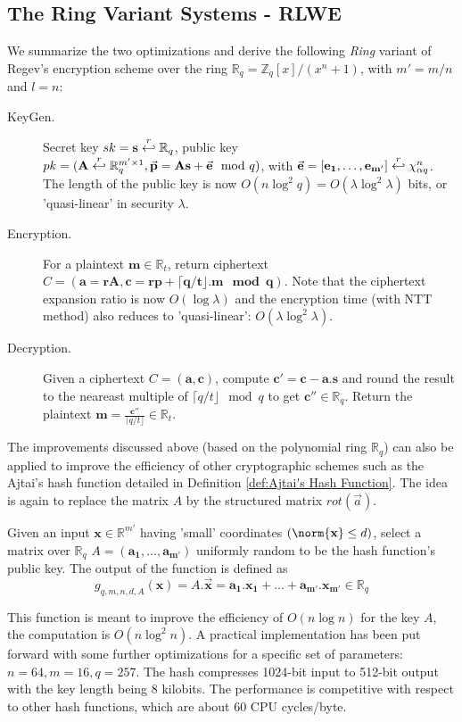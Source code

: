 \subsection{The Ring Variant Systems - RLWE}
\label{sec:RLWEPre}
We summarize the two optimizations and derive the following \emph{Ring} variant
of Regev's encryption scheme over the ring
$\mathbb{R}_q = \mathbb{Z}_q[x]/(x^n + 1)$, with $m' = m/n$ and $l = n$:
\begin{description}
\item[KeyGen.] Secret key $sk = \mathbf{s} \stackrel{r}{\hookleftarrow} \mathbb{R}_q$, public
  key
  $pk = (\mathbf{A} \stackrel{r}{\hookleftarrow} \mathbb{R}_q^{m' \times 1}, \vec{\mathbf{p}} =
  \mathbf{As} + \vec{\mathbf{e}} \mod q )$, with
  $\vec{\mathbf{e}} = [\mathbf{e_1, \dots, e_{m'}}] \stackrel{r}{\hookleftarrow} \chi_{\alpha
    q}^n$. The length of the public key is now
  $O(n \log^2 q) = O(\lambda \log^2 \lambda)$ bits, or 'quasi-linear' in
  security $\lambda$.
\item [Encryption.] For a plaintext $\mathbf{m} \in \mathbb{R}_t$, return
  ciphertext
  $C = (\mathbf{a = rA}, \mathbf{c = rp + \lceil q/t \rfloor. m \mod q })$. Note
  that the ciphertext expansion ratio is now $O(\log \lambda)$ and the
  encryption time (with NTT method) also reduces to 'quasi-linear':
  $O(\lambda \log^2 \lambda)$.
\item [Decryption.] Given a ciphertext $C = \mathbf{(a,c)}$, compute
  $\mathbf{c' = c - a.s}$ and round the result to the neareast multiple of
  $\lceil q/t \rfloor \mod q$ to get $\mathbf{c''} \in \mathbb{R}_q$. Return the
  plaintext
  $\mathbf{m} = \frac{\mathbf{c''}}{\lceil q/t \rfloor} \in \mathbb{R}_t$.
\end{description}
The improvements discussed above (based on the polynomial ring $\mathbb{R}_q$) can
also be applied to improve the efficiency of other cryptographic schemes such as
the Ajtai's hash function detailed in Definition \ref{def:Ajtai's Hash
  Function}. The idea is again to replace the matrix $A$ by the structured
matrix $rot(\vec{a})$.

\begin{definition}
   Given an input
  $\mathbf{x} \in \mathbb{R}^{m'}$ having 'small' coordinates
  $(\norm{\mathbf{x}} \leq d)$, select a matrix over $\mathbb{R}_q$
  $A=(\mathbf{a_1, \dots, a_{m'}})$ uniformly random to be the hash function's
  public key.  The output of the function is defined as
  \[
    g_{q,m,n,d,A}(\mathbf{x}) = A.\vec{\mathbf{x}} = \mathbf{a_1.x_1 + \dots +
      a_{m'}.x_{m'}} \in \mathbb{R}_q
  \]
  \label{def:AjtaiRing}
\end{definition}
This function is meant to improve the efficiency of $O(n\log n)$ for the key $A$,
the computation is $O(n\log^2 n)$. A practical implementation has been put forward
\cite{lyubashevsky2008swifft} with some further optimizations for a specific set
of parameters: $n = 64, m = 16, q = 257$. The hash compresses 1024-bit input to
512-bit output with the key length being 8 kilobits. The performance is competitive with respect to
other hash functions, which are about 60 CPU cycles/byte.

